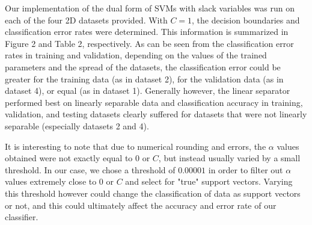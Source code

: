 \documentclass{article}
\begin{document}
Our implementation of the dual form of SVMs with slack variables was run on each of the four 2D datasets provided. With $C=1$, the decision boundaries and classification error rates were determined. This information is summarized in Figure 2 and Table 2, respectively. As can be seen from the classification error rates in training and validation, depending on the values of the trained parameters and the spread of the datasets, the classification error could be greater for the training data (as in dataset 2), for the validation data (as in dataset 4), or equal (as in dataset 1). Generally however, the linear separator performed best on linearly separable data and classification accuracy in training, validation, and testing datasets clearly suffered for datasets that were not linearly separable (especially datasets 2 and 4).

It is interesting to note that due to numerical rounding and errors, the $\alpha$ values obtained were not exactly equal to 0 or $C$, but instead usually varied by a small threshold. In our case, we chose a threshold of $0.00001$ in order to filter out $\alpha$ values extremely close to 0 or $C$ and select for "true" support vectors. Varying this threshold however could change the classification of data as support vectors or not, and this could ultimately affect the accuracy and error rate of our classifier.
\end{document}
